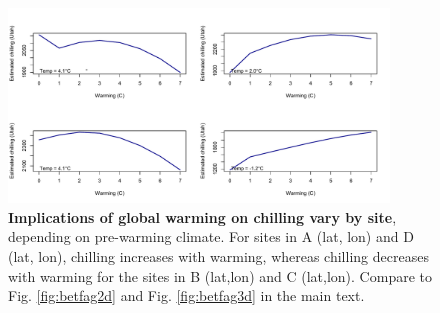 \documentclass{article}
\begin{document}
\begin{figure}[h!]
\centering
\noindent \includegraphics[width=0.9\textwidth]{..//..//analyses/bb_analysis/figures/forecasting/chillforecast_bothspp_PEP_utah.pdf}
\caption{\textbf{Implications of global warming on chilling vary by site}, depending on pre-warming climate. For sites in A (lat, lon) and D (lat, lon), chilling increases with warming, whereas chilling decreases with warming for the sites in B (lat,lon) and C (lat,lon). Compare to Fig. \ref{fig:betfag2d} and Fig. \ref{fig:betfag3d} in the main text.}
\label{fig:chillfore}
\end{figure}




\pagebreak
\pagebreak
\newpage


\end{document}
